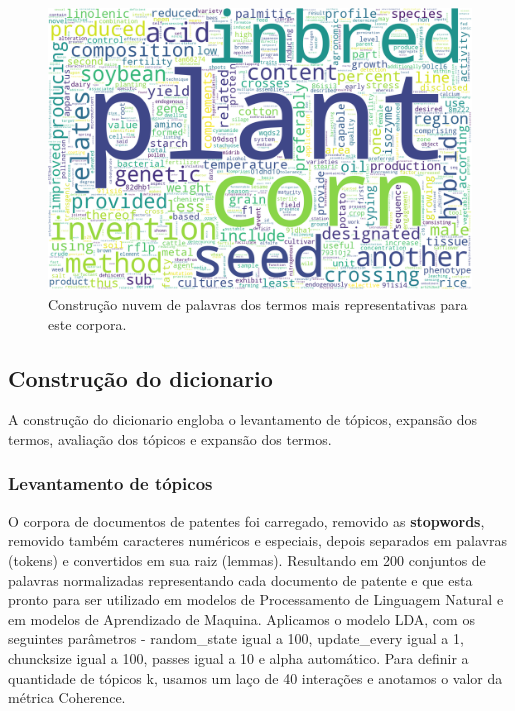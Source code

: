 \begin{figure}[ht!]
	\centering
	\includegraphics[scale=0.3]{imagens/wordcloud_preprocess.png}
	\caption{Construção nuvem de palavras dos termos mais representativas para este corpora.
			 \label{wordcloud_pre_image}}
\end{figure}

\subsection{Construção do dicionario}

A construção do dicionario engloba o levantamento de tópicos, expansão dos termos, avaliação dos tópicos e expansão dos termos.

\subsubsection{Levantamento de tópicos}

O corpora de documentos de patentes foi carregado, removido as \textbf{stopwords}, removido também caracteres numéricos e especiais, depois separados em palavras (tokens) e convertidos em sua raiz (lemmas). Resultando em 200 conjuntos de palavras normalizadas representando cada documento de patente e que esta pronto para ser utilizado em modelos de Processamento de Linguagem Natural e em modelos de Aprendizado de Maquina.
Aplicamos o modelo LDA, com os seguintes parâmetros - random\_state igual a 100, update\_every igual a 1, chuncksize igual a 100, passes igual a 10 e alpha automático. Para definir a quantidade de tópicos k, usamos um laço de 40 interações e anotamos o valor da métrica Coherence.

